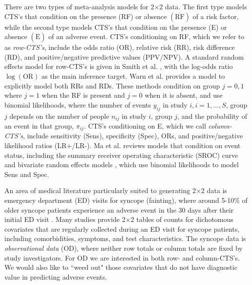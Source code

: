 \documentclass[AMA,STIX1COL]{WileyNJD-v2}
\newcommand{\Ebar}{\overline{\mbox{E}}}
\newcommand{\RFbar}{\overline{\mbox{RF}}}
\begin{document}
There are two types of meta-analysis models for 2$\times$2 data. The first type models CTS's that condition on the presence (RF) or absence $(\RFbar)$ of a risk factor, while the second type models CTS's that condition on the presence (E) or absence $(\Ebar)$ of an adverse event. CTS's conditioning on RF, which we refer to as \textit{row-CTS's}, include the odds ratio (OR), relative risk (RR), risk difference (RD), and positive/negative predictive values (PPV/NPV). A standard random effects model for row-CTS's is given in Smith et al. \cite{smith1995}, with the log-odds ratio $\log(\mbox{OR})$ as the main inference target. Warn et al. \cite{warn2002} provides a model to explicitly model both RRs and RDs. These methods condition on group $j = 0, 1$ where $j=1$ when the RF is present and $j=0$ when it is absent, and use binomial likelihoods, where the number of events $y_{ij}$ in study $i, i = 1, \dots, S$, group $j$ depends on the number of people $n_{ij}$ in study $i$, group $j$, and the probability of an event in that group, $\pi_{ij}$. CTS's conditioning on E, which we call \textit{column-CTS's}, include sensitivity (Sens), specificity (Spec), ORs, and positive/negative likelihood ratios (LR+/LR-). Ma et al. \cite{ma2016} reviews models that condition on event status, including the summary receiver operating characteristic (SROC) curve \cite{rutter2001, moses1993} and bivariate random effects models \cite{reitsma2005, chu2006, arends2008}, which use binomial likelihoods to model Sens and Spec. 

An area of medical literature particularly suited to generating 2$\times$2 data is emergency department (ED) visits for syncope (fainting), where around 5-10\% of older syncope patients experience an adverse event in the 30 days after their initial ED visit \cite{gibson2018}. Many studies provide 2$\times$2 tables of counts for dichotomous covariates that are regularly collected during an ED visit for syncope patients, including comorbidities, symptoms, and test characteristics. The syncope data is \textit{observational data} (OD), where neither row totals or column totals are fixed by study investigators. For OD we are interested in both row- and column-CTS's. We would also like to ``weed out" those covariates that do not have diagnostic value in predicting adverse events. 
\end{document}
